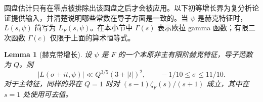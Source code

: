 \documentclass[11pt,a4paper]{article}
\numberwithin{equation}{section}
\numberwithin{figure}{section}
\newtheorem{lemma}[theorem]{Lemma}
\theoremstyle{definition}
\theoremstyle{remark}
\begin{document}
圆盘估计只有在零点被排除出该圆盘之后才会被应用。以下初等增长界为复分析论证提供输入，并清楚说明哪些常数在导子方面是一致的。当 $\psi$ 是赫克特征时，$L(s,\psi)$ 简写为
$L_F(s,\psi)$。在本小节中 $\Gamma(s)$ 表示欧拉 gamma 函数；有限二次函数 $\Gamma(c)$ 仅限于上面的算术恒等式。

\begin{lemma}[赫克带增长]\label{lem:hecke-strip-growth}
设 $\psi$ 是 $F$ 的一个本原非主有限阶赫克特征，导子范数为 $Q$。则
\begin{equation}\label{eq:hecke-growth}
 |L(\sigma+it,\psi)|\ll Q^{3/5}(3+|t|)^2,
 \qquad-1/10\le\sigma\le11/10.
\end{equation}
对于主特征，同样的界在 $Q=1$ 时对
$(s-1)\zeta_F(s)/(s+1)$ 成立，其中在 $s=1$ 处使用可去值。
\end{lemma}
\end{document}
